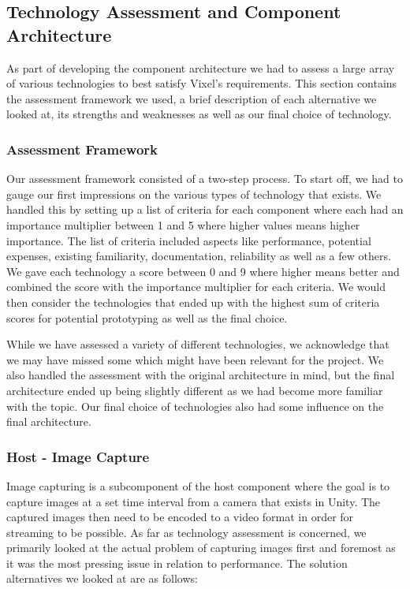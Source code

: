 \subsection{Technology Assessment and Component Architecture}
As part of developing the component architecture we had to assess a large array of various technologies to best satisfy Vixel's requirements. This section contains the assessment framework we used, a brief description of each alternative we looked at, its strengths and weaknesses as well as our final choice of technology.  

\subsubsection{Assessment Framework}
Our assessment framework consisted of a two-step process. To start off, we had to gauge our first impressions on the various types of technology that exists. We handled this by setting up a list of criteria for each component where each had an importance multiplier between 1 and 5 where higher values means higher importance. The list of criteria included aspects like performance, potential expenses, existing familiarity, documentation, reliability as well as a few others. We gave each technology a score between 0 and 9 where higher means better and combined the score with the importance multiplier for each criteria. We would then consider the technologies that ended up with the highest sum of criteria scores for potential prototyping as well as the final choice. 

While we have assessed a variety of different technologies, we acknowledge that we may have missed some which might have been relevant for the project. We also handled the assessment with the original architecture in mind, but the final architecture ended up being slightly different as we had become more familiar with the topic. Our final choice of technologies also had some influence on the final architecture. 

\subsubsection{Host - Image Capture} %
Image capturing is a subcomponent of the host component where the goal is to capture images at a set time interval from a camera that exists in Unity. The captured images then need to be encoded to a video format in order for streaming to be possible. As far as technology assessment is concerned, we primarily looked at the actual problem of capturing images first and foremost as it was the most pressing issue in relation to performance. The solution alternatives we looked at are as follows:

